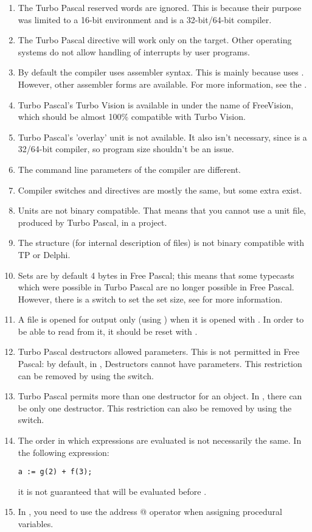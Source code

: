 \begin{enumerate}
\item The Turbo Pascal reserved words  are ignored.
This is because their purpose was limited to a 16-bit environment
and \fpc is a 32-bit/64-bit compiler.
\item The Turbo Pascal  directive will work only on the \fpc \dos target.
Other operating systems do not allow handling of interrupts by user
programs.
\item By default the \fpc compiler uses   assembler syntax.
This is mainly because \fpc uses \gnu {}. However, other assembler
forms are available. For more information, see the \progref.
\item Turbo Pascal's Turbo Vision is available in \fpc under the name of
FreeVision, which should be almost 100\% compatible with Turbo Vision.
\item Turbo Pascal's 'overlay' unit is not available. It also isn't necessary, since
\fpc is a 32/64-bit compiler, so program size shouldn't be an issue.
\item The command line parameters of the compiler are different.
\item Compiler switches and directives are mostly the same, but some extra
exist.
\item Units are not binary compatible. That means that you cannot use a
 unit file, produced by Turbo Pascal, in a \fpc project.
\item The \fpc {} structure (for internal description of files) is not
binary compatible with TP or Delphi.
\item Sets are by default 4 bytes in Free Pascal; this means that some typecasts
which were possible in Turbo Pascal are no longer possible in Free Pascal.
However, there is a switch to set the set size, see \progref for more
information.
\item A file is opened for output only (using ) when it is
opened with . In order to be able to read from it, it should
be reset with .
\item Turbo Pascal destructors allowed parameters. This is not
permitted in Free Pascal: by default, in \fpc, Destructors cannot have parameters.
This restriction can be removed by using the  switch.
\item Turbo Pascal permits more than one destructor for an object. In \fpc,
there can be only one destructor. This restriction can also be removed by
using the  switch.
\item The order in which expressions are evaluated is not necessarily the
same. In the following expression:
\begin{verbatim}
a := g(2) + f(3);
\end{verbatim}
it is not guaranteed that  will be evaluated before .
\item In \fpc, you need to use the address @ operator when assigning procedural
variables.
\end{enumerate}

